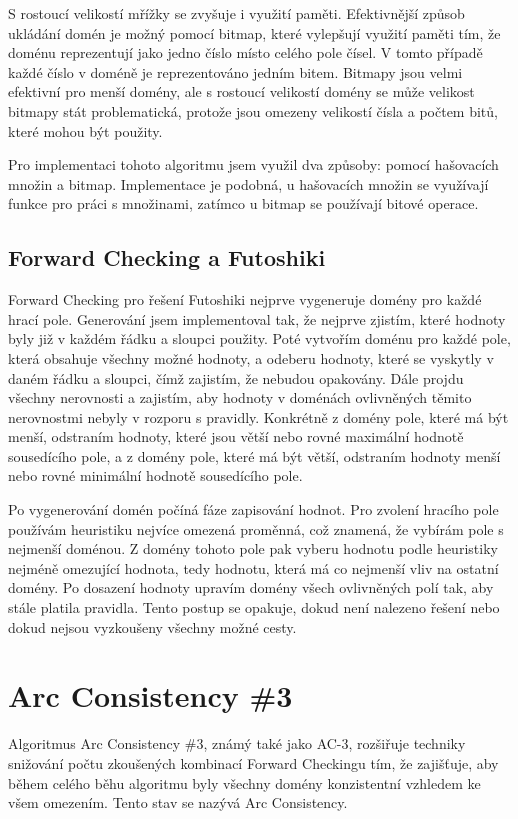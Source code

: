 S rostoucí velikostí mřížky se zvyšuje i využití paměti. Efektivnější způsob
ukládání domén je možný pomocí bitmap, které vylepšují využití paměti tím, že
doménu reprezentují jako jedno číslo místo celého pole čísel. V tomto případě
každé číslo v doméně je reprezentováno jedním bitem. Bitmapy jsou velmi
efektivní pro menší domény, ale s rostoucí velikostí domény se může velikost
bitmapy stát problematická, protože jsou omezeny velikostí čísla a počtem bitů,
které mohou být použity.

Pro implementaci tohoto algoritmu jsem využil dva způsoby: pomocí hašovacích
množin a bitmap. Implementace je podobná, u hašovacích množin se využívají
funkce pro práci s množinami, zatímco u bitmap se používají bitové operace.

\subsection{Forward Checking a Futoshiki}

Forward Checking pro řešení Futoshiki nejprve vygeneruje domény pro každé hrací
pole. Generování jsem implementoval tak, že nejprve zjistím, které hodnoty byly
již v každém řádku a sloupci použity. Poté vytvořím doménu pro každé pole,
která obsahuje všechny možné hodnoty, a odeberu hodnoty, které se vyskytly v
daném řádku a sloupci, čímž zajistím, že nebudou opakovány. Dále projdu všechny
nerovnosti a zajistím, aby hodnoty v doménách ovlivněných těmito nerovnostmi
nebyly v rozporu s pravidly. Konkrétně z domény pole, které má být menší,
odstraním hodnoty, které jsou větší nebo rovné maximální hodnotě sousedícího
pole, a z domény pole, které má být větší, odstraním hodnoty menší nebo rovné
minimální hodnotě sousedícího pole.

Po vygenerování domén počíná fáze zapisování hodnot. Pro zvolení hracího pole
používám heuristiku nejvíce omezená proměnná, což znamená, že vybírám pole s
nejmenší doménou. Z domény tohoto pole pak vyberu hodnotu podle heuristiky
nejméně omezující hodnota, tedy hodnotu, která má co nejmenší vliv na ostatní
domény. Po dosazení hodnoty upravím domény všech ovlivněných polí tak, aby
stále platila pravidla. Tento postup se opakuje, dokud není nalezeno řešení
nebo dokud nejsou vyzkoušeny všechny možné cesty.

\section{Arc Consistency \#3}

Algoritmus Arc Consistency \#3, známý také jako AC-3, rozšiřuje techniky
snižování počtu zkoušených kombinací Forward Checkingu tím, že zajišťuje, aby
během celého běhu algoritmu byly všechny domény konzistentní vzhledem ke všem
omezením. Tento stav se nazývá Arc Consistency.

